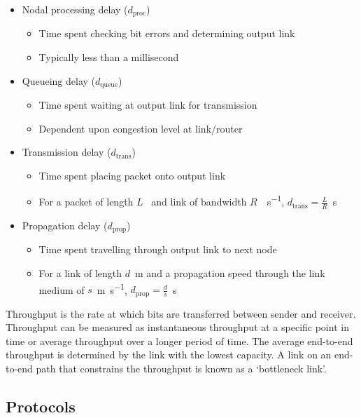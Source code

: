 \begin{itemize}
  \item Nodal processing delay (\( d_{\text{proc}} \))
  \begin{itemize}
    \item Time spent checking bit errors and determining output link
    \item Typically less than a millisecond
  \end{itemize}
  \item Queueing delay (\( d_{\text{queue}} \))
  \begin{itemize}
    \item Time spent waiting at output link for transmission
    \item Dependent upon congestion level at link/router
  \end{itemize}
  \item Transmission delay (\( d_{\text{trans}} \))
  \begin{itemize}
    \item Time spent placing packet onto output link
    \item For a packet of length \(L\)~\si{\bit} and link of bandwidth \(R\)~\si{\bit\per\second}, \( d_{\text{trans}} = \frac{L}{R} \)~\si{\second}
  \end{itemize}
  \item Propagation delay (\( d_{\text{prop}} \))
  \begin{itemize}
    \item Time spent travelling through output link to next node
    \item For a link of length \(d\)~\si{\metre} and a propagation speed through the link medium of \(s\)~\si{\metre\per\second}, \( d_{\text{prop}} = \frac{d}{s} \)~\si{\second}
  \end{itemize}
\end{itemize}

Throughput is the rate at which bits are transferred between sender and receiver.
Throughput can be measured as instantaneous throughput at a specific point in time or average throughput over a longer period of time.
The average end-to-end throughput is determined by the link with the lowest capacity.
A link on an end-to-end path that constrains the throughput is known as a `bottleneck link'.

\subsection{Protocols}

